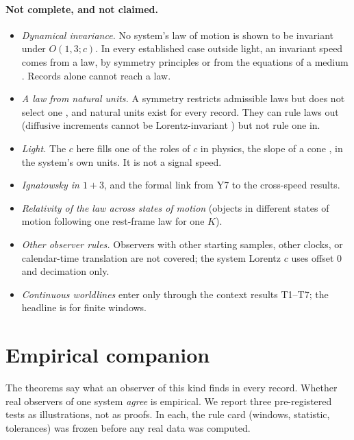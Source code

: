 \documentclass[11pt]{article}
\theoremstyle{definition}
\theoremstyle{plain}
\theoremstyle{remark}
\begin{document}
\paragraph{Not complete, and not claimed.}
\begin{itemize}
\item \emph{Dynamical invariance.} No system's law of motion is shown to be invariant under $O(1,3;c)$. In every established case outside light, an invariant speed comes from a law, by symmetry principles \cite{levyleblond1976} or from the equations of a medium \cite{unruh1981}. Records alone cannot reach a law.
\item \emph{A law from natural units.} A symmetry restricts admissible laws but does not select one \cite{wigner1939}, and natural units exist for every record. They can rule laws out (diffusive increments cannot be Lorentz-invariant \cite{dunkel2009}) but not rule one in.
\item \emph{Light.} The $c$ here fills one of the roles of $c$ in physics, the slope of a cone \cite{ellis2005}, in the system's own units. It is not a signal speed.
\item \emph{Ignatowsky in $1+3$}, and the formal link from Y7 to the cross-speed results.
\item \emph{Relativity of the law across states of motion} (objects in different states of motion following one rest-frame law for one $K$).
\item \emph{Other observer rules.} Observers with other starting samples, other clocks, or calendar-time translation are not covered; the system Lorentz $c$ uses offset $0$ and decimation only.
\item \emph{Continuous worldlines} enter only through the context results T1--T7; the headline is for finite windows.
\end{itemize}

\section{Empirical companion}\label{sec:empirical}

The theorems say what an observer of this kind finds in every record. Whether real observers of one system \emph{agree} is empirical. We report three pre-registered tests as illustrations, not as proofs. In each, the rule card (windows, statistic, tolerances) was frozen before any real data was computed.
\end{document}
